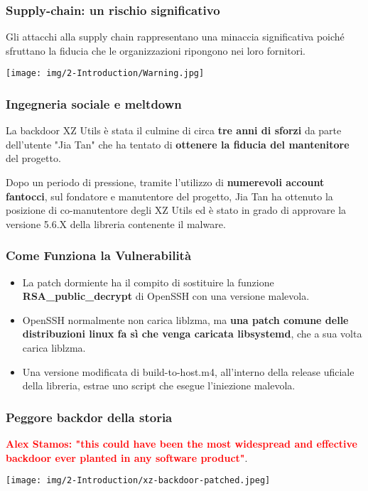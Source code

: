 \begin{frame}
\frametitle{Supply-chain: un rischio significativo}

Gli attacchi alla supply chain rappresentano una minaccia significativa poiché sfruttano la fiducia che le organizzazioni ripongono nei loro fornitori.
\begin{center}
  \texttt{[image: img/2-Introduction/Warning.jpg]}  
\end{center}
    
\end{frame}

\begin{frame}
\frametitle{Ingegneria sociale e meltdown}
La backdoor XZ Utils è stata il culmine di circa \textbf{tre anni di sforzi} da parte dell'utente "Jia Tan" che ha tentato di \textbf{ottenere la fiducia del mantenitore} del progetto.

\vspace{0.5 cm}

Dopo un periodo di pressione, tramite l'utilizzo di \textbf{numerevoli account fantocci}, sul fondatore e manutentore del progetto, Jia Tan ha ottenuto la posizione di co-manutentore degli XZ Utils ed è stato in grado di approvare la versione 5.6.X della libreria contenente il malware.

\end{frame}

\begin{frame}
    \frametitle{Come Funziona la Vulnerabilità}
    \begin{itemize}
        \item La patch dormiente ha il compito di sostituire la funzione \textbf{RSA\_public\_decrypt} di OpenSSH con una versione malevola.
        \item OpenSSH normalmente non carica liblzma, ma \textbf{una patch comune delle distribuzioni linux fa sì che venga caricata libsystemd}, che a sua volta carica liblzma.
        \item Una versione modificata di build-to-host.m4, all'interno della release uficiale della libreria, estrae uno script che esegue l'iniezione malevola.
    \end{itemize}
\end{frame}

\begin{frame}
    \frametitle{Peggore backdor della storia}
    \textbf{\textcolor{red}{Alex Stamos: "this could have been the most widespread and effective backdoor ever planted in any software product"}}.

    \begin{center}
        \texttt{[image: img/2-Introduction/xz-backdoor-patched.jpeg]}
    \end{center}
\vspace{0.5 cm}

\end{frame}